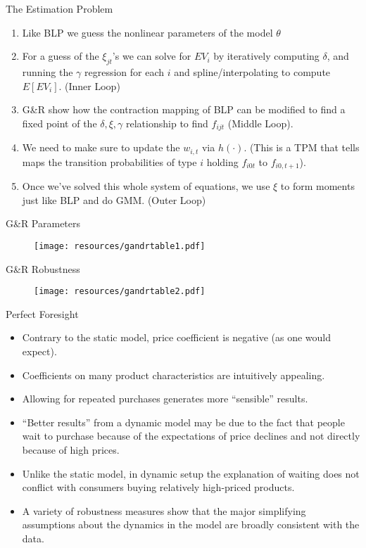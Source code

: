 \begin{frame}{The Estimation Problem}
\begin{enumerate}
\item Like BLP we guess the nonlinear parameters of the model $\theta$
\item For a guess of the $\xi_{jt}$'s we can solve for $EV_i$ by iteratively computing $\delta$, and running the $\gamma$ regression for each $i$ and spline/interpolating to compute $E[EV_i]$. (Inner Loop)
\item G\&R show how the contraction mapping of BLP can be modified to find a fixed point of the $\delta,\xi,\gamma$ relationship to find $f_{ijt}$ (Middle Loop).
\item We need to make sure to update the $w_{i,t}$ via $h(\cdot)$.  (This is a TPM that tells maps the transition probabilities of type $i$ holding $f_{i0t}$ to $f_{i0,t+1}$).
\item Once we've solved this whole system of equations, we use $\xi$ to form moments just like BLP and do GMM. (Outer Loop)
\end{enumerate}
\end{frame}

\begin{frame}{G\&R Parameters}
\begin{figure}[htbp]
\begin{center}
\texttt{[image: resources/gandrtable1.pdf]}
\end{center}
\end{figure}
\end{frame}

\begin{frame}{G\&R Robustness}
\begin{figure}[htbp]
\begin{center}
\texttt{[image: resources/gandrtable2.pdf]}
\end{center}
\end{figure}
\end{frame}


\begin{frame}{Perfect Foresight}
\begin{itemize}
\item Contrary to the static model, price coefficient is negative (as one would expect).
\item Coefficients on many product characteristics are intuitively appealing.
\item Allowing for repeated purchases generates more ``sensible'' results.
\item ``Better results'' from a dynamic model may be due to the fact that people wait to purchase because of the expectations of price declines and not directly because of high prices.
\item Unlike the static model, in dynamic setup the explanation of waiting does not conflict with consumers buying relatively high-priced products.
\item A variety of robustness measures show that the major simplifying assumptions about the dynamics in the model are broadly consistent with the data.
\end{itemize}
\end{frame}

